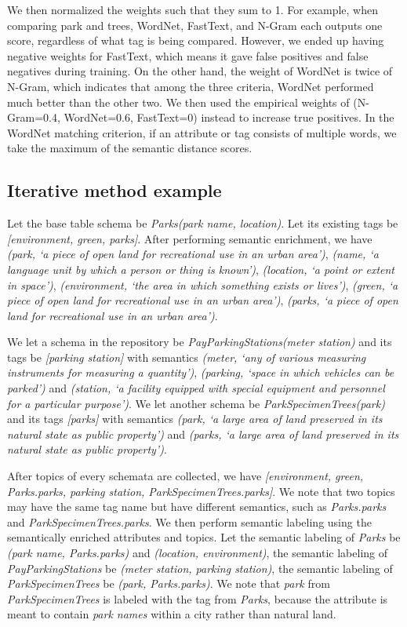 We then normalized the weights such that they sum to 1. For example, when comparing park and trees, WordNet, FastText, and N-Gram each outputs one score, regardless of what tag is being compared. However, we ended up having negative weights for FastText, which means it gave false positives and false negatives during training. On the other hand, the weight of WordNet is twice of N-Gram, which indicates that among the three criteria, WordNet performed much better than the other two. We then used the empirical weights of (N-Gram=0.4, WordNet=0.6, FastText=0) instead to increase true positives. In the WordNet matching criterion, if an attribute or tag consists of multiple words, we take the maximum of the semantic distance scores.

\subsection{Iterative method example}
\label{ssec:IterativeMethodExample2}

Let the base table schema be \textit{Parks(park name, location)}. Let its existing tags be \textit{[environment, green, parks]}. After performing semantic enrichment, we have \textit{(park, `a piece of open land for recreational use in an urban area')}, \textit{(name, `a language unit by which a person or thing is known')}, \textit{(location, `a point or extent in space')}, \textit{(environment, `the area in which something exists or lives')}, \textit{(green, `a piece of open land for recreational use in an urban area')}, \textit{(parks, `a piece of open land for recreational use in an urban area')}.

We let a schema in the repository be \textit{PayParkingStations(meter station)} and its tags be \textit{[parking station]} with semantics \textit{(meter, `any of various measuring instruments for measuring a quantity')}, \textit{(parking, `space in which vehicles can be parked')} and \textit{(station, `a facility equipped with special equipment and personnel for a particular purpose')}. We let another schema be \textit{ParkSpecimenTrees(park)} and its tags \textit{[parks]} with semantics \textit{(park, `a large area of land preserved in its natural state as public property')} and \textit{(parks, `a large area of land preserved in its natural state as public property')}.

After topics of every schemata are collected, we have \textit{[environment, green, Parks.parks, parking station, ParkSpecimenTrees.parks]}. We note that two topics may have the same tag name but have different semantics, such as \textit{Parks.parks} and \textit{ParkSpecimenTrees.parks}. We then perform semantic labeling using the semantically enriched attributes and topics. Let the semantic labeling of \textit{Parks} be \textit{(park name, Parks.parks)} and \textit{(location, environment)}, the semantic labeling of \textit{PayParkingStations} be \textit{(meter station, parking station)}, the semantic labeling of \textit{ParkSpecimenTrees} be \textit{(park, Parks.parks)}. We note that \textit{park} from \textit{ParkSpecimenTrees} is labeled with the tag from \textit{Parks}, because the attribute is meant to contain \textit{park names} within a city rather than natural land.


